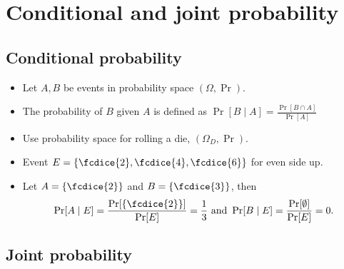 
\section{Conditional and joint probability}

\subsection{Conditional probability}

\begin{frame}
  \begin{definition}
    \begin{itemize}
      \item Let \(A, B\) be events in probability space \((\Omega, \Pr)\).
      \item The probability of \(B\) given \(A\) is defined as \(\Pr[B\mid A] 
          = \frac{\Pr[B\cap A]}{\Pr[A]}\)
    \end{itemize}
  \end{definition}

  \pause{}
  
  \begin{example}
    \begin{itemize}
      \item Use probability space for rolling a die, \((\Omega_D, \Pr)\).
      \item Event \(E = \{\fcdice{2}, \fcdice{4}, \fcdice{6}\}\) for even side 
        up.

        \pause{}

      \item Let \(A = \{\fcdice{2}\}\) and \(B = \{\fcdice{3}\}\), then
        \[\Pr[A\mid E] = \frac{\Pr[\{\fcdice{2}\}]}{\Pr[E]} = \frac{1}{3}
          \text{ and }
          \Pr[B\mid E] = \frac{\Pr[\emptyset]}{\Pr[E]} = 0.\]

    \end{itemize}
  \end{example}
\end{frame}

\subsection{Joint probability}


